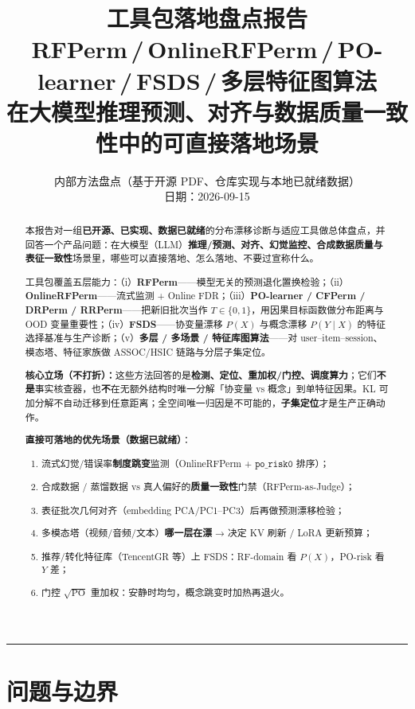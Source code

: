 \documentclass[11pt,a4paper,UTF8,fontset=none]{ctexart}
\title{\textbf{工具包落地盘点报告}\\[0.35em]
\large RFPerm\,/\,OnlineRFPerm\,/\,PO-learner\,/\,FSDS\,/\,多层特征图算法\\
在大模型推理预测、对齐与数据质量一致性中的可直接落地场景}
\author{内部方法盘点（基于开源 PDF、仓库实现与本地已就绪数据）\\
日期：2026-09-15}
\date{}
\newcommand{\meth}[1]{\textbf{#1}}
\begin{document}
\maketitle
\begin{abstract}
本报告对一组\textbf{已开源、已实现、数据已就绪}的分布漂移诊断与适应工具做总体盘点，并回答一个产品问题：在大模型（LLM）\textbf{推理/预测、对齐、幻觉监控、合成数据质量与表征一致性}场景里，哪些可以直接落地、怎么落地、不要过宣称什么。

工具包覆盖五层能力：（i）\meth{RFPerm}——模型无关的预测退化置换检验；（ii）\meth{OnlineRFPerm}——流式监测 + Online FDR；（iii）\meth{PO-learner / CFPerm / DRPerm / RRPerm}——把新旧批次当作 \(T\in\{0,1\}\)，用因果目标函数做分布距离与 OOD 变量重要性；（iv）\meth{FSDS}——协变量漂移 \(P(X)\) 与概念漂移 \(P(Y\mid X)\) 的特征选择基准与生产诊断；（v）\meth{多层 / 多场景 / 特征库图算法}——对 user--item--session、模态塔、特征家族做 ASSOC/HSIC 链路与分层子集定位。

\textbf{核心立场（不打折）：}这些方法回答的是\textbf{检测、定位、重加权/门控、调度算力}；它们\textbf{不是}事实核查器，也\textbf{不}在无额外结构时唯一分解「协变量 vs 概念」到单特征因果。KL 可加分解不自动迁移到任意距离；全空间唯一归因是不可能的，\textbf{子集定位}才是生产正确动作。

\textbf{直接可落地的优先场景（数据已就绪）}：
\begin{enumerate}
  \item 流式幻觉/错误率\textbf{制度跳变}监测（OnlineRFPerm + \(\texttt{po\_risk0}\) 排序）；
  \item 合成数据 / 蒸馏数据 vs 真人偏好的\textbf{质量一致性}门禁（RFPerm-as-Judge）；
  \item 表征批次几何对齐（embedding PCA/PC1--PC3）后再做预测漂移检验；
  \item 多模态塔（视频/音频/文本）\textbf{哪一层在漂} → 决定 KV 刷新 / LoRA 更新预算；
  \item 推荐/转化特征库（TencentGR 等）上 FSDS：RF-domain 看 \(P(X)\)，PO-risk 看 \(Y\) 差；
  \item 门控 \(\sqrt{\mathrm{PO}}\) 重加权：安静时均匀，概念跳变时加热再退火。
\end{enumerate}
\end{abstract}

\tableofcontents
\vspace{0.6em}
\noindent\rule{\textwidth}{0.4pt}

\section{问题与边界}
\label{sec:boundary}
\end{document}
